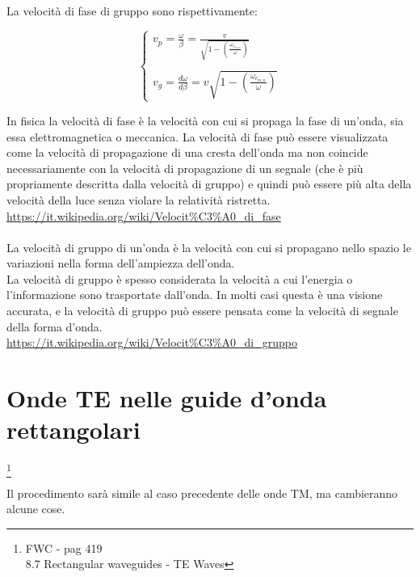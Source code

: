 La velocità di fase di gruppo sono rispettivamente: 

{
    \Large
    \begin{equation}
        \begin{cases}
            v_p 
            = 
            \frac{\omega}{\beta} 
            = 
            \frac{v}{\sqrt{1 - (\frac{\omega_{c_{m,n}}}{\omega})}}
            \\ \\
            v_g 
            = 
            \frac{ d \omega}{ d \beta} 
            = 
            v\sqrt{1 - (\frac{\omega_{c_{m,n}}}{\omega})}
        \end{cases}
    \end{equation}
}

\begin{tcolorbox}
    In fisica la velocità di fase è la velocità con cui si propaga la fase di un'onda, sia essa elettromagnetica o meccanica. La velocità di fase può essere visualizzata come la velocità di propagazione di una cresta dell'onda ma non coincide necessariamente con la velocità di propagazione di un segnale (che è più propriamente descritta dalla velocità di gruppo) e quindi può essere più alta della velocità della luce senza violare la relatività ristretta. \\
    \url{https://it.wikipedia.org/wiki/Velocit%C3%A0_di_fase} \\ \\
    La velocità di gruppo di un'onda è la velocità con cui si propagano nello spazio le variazioni nella forma dell'ampiezza dell'onda. \\
    La velocità di gruppo è spesso considerata la velocità a cui l'energia o l'informazione sono trasportate dall'onda. In molti casi questa è una visione accurata, e la velocità di gruppo può essere pensata come la velocità di segnale della forma d'onda. \\
    \url{https://it.wikipedia.org/wiki/Velocit%C3%A0_di_gruppo}
\end{tcolorbox}

\newpage 

\section{Onde TE nelle guide d'onda rettangolari} 

\footnote{FWC - pag 419 \\ 8.7 Rectangular waveguides - TE Waves}

Il procedimento sarà simile al caso precedente delle onde TM, ma cambieranno alcune cose. \\ 

